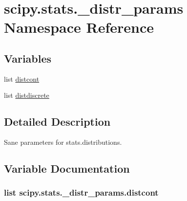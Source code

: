 \hypertarget{namespacescipy_1_1stats_1_1__distr__params}{}\section{scipy.\+stats.\+\_\+distr\+\_\+params Namespace Reference}
\label{namespacescipy_1_1stats_1_1__distr__params}
\subsection*{Variables}
\begin{DoxyCompactItemize}
\item 
list \hyperlink{namespacescipy_1_1stats_1_1__distr__params_a5642011b5815c18d564ac03b3b267e3e}{distcont}
\item 
list \hyperlink{namespacescipy_1_1stats_1_1__distr__params_a5822fbc11e7712df9d75aa2305f4a99b}{distdiscrete}
\end{DoxyCompactItemize}


\subsection{Detailed Description}
\begin{DoxyVerb}Sane parameters for stats.distributions.
\end{DoxyVerb}
 

\subsection{Variable Documentation}
\hypertarget{namespacescipy_1_1stats_1_1__distr__params_a5642011b5815c18d564ac03b3b267e3e}{}
\subsubsection[{distcont}]{\setlength{\rightskip}{0pt plus 5cm}list scipy.\+stats.\+\_\+distr\+\_\+params.\+distcont}\label{namespacescipy_1_1stats_1_1__distr__params_a5642011b5815c18d564ac03b3b267e3e}
\hypertarget{namespacescipy_1_1stats_1_1__distr__params_a5822fbc11e7712df9d75aa2305f4a99b}{}
